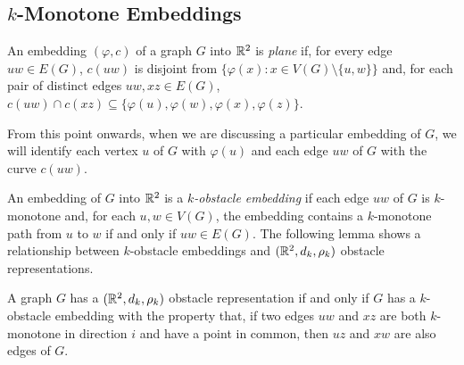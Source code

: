 \documentclass{patmorin}
\begin{document}
\subsection{$k$-Monotone Embeddings}

An embedding $(\varphi,c)$ of a graph $G$ into $\mathbb{R}^2$
is \emph{plane} if, for every edge $uw\in E(G)$, $c(uw)$
is disjoint from $\{\varphi(x) : x\in V(G)\setminus\{u,w\}\}$
and, for each pair of distinct edges $uw,xz\in E(G)$, $c(uw)\cap
c(xz)\subseteq\{\varphi(u),\varphi(w),\varphi(x),\varphi(z)\}$. 

From this point onwards, when we are discussing a particular embedding
of $G$, we will identify each vertex $u$ of $G$ with $\varphi(u)$ and
each edge $uw$ of $G$ with the curve $c(uw)$.

An embedding of $G$ into $\mathbb{R}^2$ is a \emph{$k$-obstacle embedding} if each edge $uw$ of $G$ is $k$-monotone and, for each $u,w\in V(G)$, the embedding contains a $k$-monotone path from $u$ to $w$ if and only if $uw\in E(G)$.
The following lemma shows a
relationship between $k$-obstacle embeddings and $(\mathbb{R}^2,d_k,\rho_k)$
obstacle representations.


\begin{lem}
   A graph $G$ has a $(\mathbb{R}^2,d_k,\rho_k)$ obstacle representation if and
   only if $G$ has a $k$-obstacle embedding with the property that,
   if two edges $uw$ and $xz$ are both $k$-monotone in direction $i$
   and have a point in common, then $uz$ and $xw$ are also edges of $G$.
\end{lem}
\end{document}
